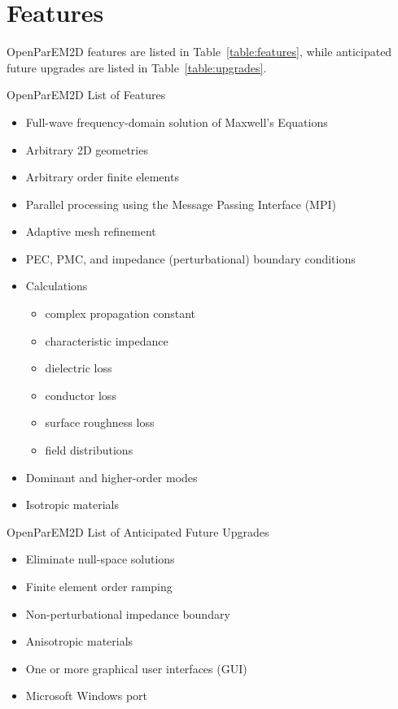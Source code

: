 \documentclass[titlepage]{article}
\renewcommand\_{\textunderscore\linebreak[1]}
\begin{document}
\section{Features}

OpenParEM2D features are listed in Table~\ref{table:features}, while anticipated future upgrades are listed in Table~\ref{table:upgrades}.

\begin{table}[ht]
\caption{OpenParEM2D List of Features}
\noindent \hrulefill
\begin{itemize}[nosep]
  \item Full-wave frequency-domain solution of Maxwell's Equations
  \item Arbitrary 2D geometries
  \item Arbitrary order finite elements
  \item Parallel processing using the Message Passing Interface (MPI)
  \item Adaptive mesh refinement
  \item PEC, PMC, and impedance (perturbational) boundary conditions
  \item Calculations
  \begin{itemize}
    \item complex propagation constant
    \item characteristic impedance
    \item dielectric loss
    \item conductor loss
    \item surface roughness loss
    \item field distributions
  \end{itemize}
  \item Dominant and higher-order modes
  \item Isotropic materials
\end{itemize}
\noindent \hrulefill
\label{table:features}
\end{table}

\begin{table}[ht]
\caption{OpenParEM2D List of Anticipated Future Upgrades}
\noindent \hrulefill
\begin{itemize}[nosep]
   \item Eliminate null-space solutions
   \item Finite element order ramping
   \item Non-perturbational impedance boundary
   \item Anisotropic materials
   \item One or more graphical user interfaces (GUI)
   \item Microsoft Windows\textsuperscript{\textregistered} port
\end{itemize}
\noindent \hrulefill
\label{table:upgrades}
\end{table}
\end{document}
